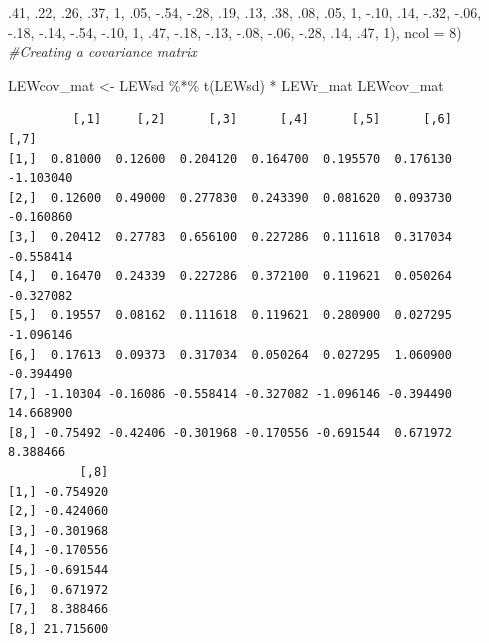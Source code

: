 \documentclass[
  11pt,
]{book}
\newenvironment{Shaded}{\begin{snugshade}}{\end{snugshade}}
\newcommand{\AttributeTok}[1]{\textcolor[rgb]{0.77,0.63,0.00}{#1}}
\newcommand{\CommentTok}[1]{\textcolor[rgb]{0.56,0.35,0.01}{\textit{#1}}}
\newcommand{\DecValTok}[1]{\textcolor[rgb]{0.00,0.00,0.81}{#1}}
\newcommand{\FunctionTok}[1]{\textcolor[rgb]{0.00,0.00,0.00}{#1}}
\newcommand{\NormalTok}[1]{#1}
\newcommand{\OtherTok}[1]{\textcolor[rgb]{0.56,0.35,0.01}{#1}}
\newcommand{\SpecialCharTok}[1]{\textcolor[rgb]{0.00,0.00,0.00}{#1}}
\begin{document}
\begin{Shaded}
\begin{Highlighting}[]
\NormalTok{        .}\DecValTok{41}\NormalTok{, .}\DecValTok{22}\NormalTok{, .}\DecValTok{26}\NormalTok{, .}\DecValTok{37}\NormalTok{, }\DecValTok{1}\NormalTok{, .}\DecValTok{05}\NormalTok{, }\SpecialCharTok{{-}}\NormalTok{.}\DecValTok{54}\NormalTok{, }\SpecialCharTok{{-}}\NormalTok{.}\DecValTok{28}\NormalTok{, }
\NormalTok{        .}\DecValTok{19}\NormalTok{, .}\DecValTok{13}\NormalTok{, .}\DecValTok{38}\NormalTok{, .}\DecValTok{08}\NormalTok{, .}\DecValTok{05}\NormalTok{, }\DecValTok{1}\NormalTok{, }\SpecialCharTok{{-}}\NormalTok{.}\DecValTok{10}\NormalTok{, .}\DecValTok{14}\NormalTok{, }
        \SpecialCharTok{{-}}\NormalTok{.}\DecValTok{32}\NormalTok{, }\SpecialCharTok{{-}}\NormalTok{.}\DecValTok{06}\NormalTok{, }\SpecialCharTok{{-}}\NormalTok{.}\DecValTok{18}\NormalTok{, }\SpecialCharTok{{-}}\NormalTok{.}\DecValTok{14}\NormalTok{, }\SpecialCharTok{{-}}\NormalTok{.}\DecValTok{54}\NormalTok{, }\SpecialCharTok{{-}}\NormalTok{.}\DecValTok{10}\NormalTok{, }\DecValTok{1}\NormalTok{, .}\DecValTok{47}\NormalTok{,}
        \SpecialCharTok{{-}}\NormalTok{.}\DecValTok{18}\NormalTok{, }\SpecialCharTok{{-}}\NormalTok{.}\DecValTok{13}\NormalTok{, }\SpecialCharTok{{-}}\NormalTok{.}\DecValTok{08}\NormalTok{, }\SpecialCharTok{{-}}\NormalTok{.}\DecValTok{06}\NormalTok{, }\SpecialCharTok{{-}}\NormalTok{.}\DecValTok{28}\NormalTok{, .}\DecValTok{14}\NormalTok{, .}\DecValTok{47}\NormalTok{, }\DecValTok{1}\NormalTok{), }\AttributeTok{ncol =} \DecValTok{8}\NormalTok{)}
\CommentTok{\#Creating a covariance matrix}

\NormalTok{LEWcov\_mat }\OtherTok{\textless{}{-}}\NormalTok{ LEWsd }\SpecialCharTok{\%*\%} \FunctionTok{t}\NormalTok{(LEWsd) }\SpecialCharTok{*}\NormalTok{ LEWr\_mat}
\NormalTok{LEWcov\_mat}
\end{Highlighting}
\end{Shaded}

\begin{verbatim}
         [,1]     [,2]      [,3]      [,4]      [,5]      [,6]      [,7]
[1,]  0.81000  0.12600  0.204120  0.164700  0.195570  0.176130 -1.103040
[2,]  0.12600  0.49000  0.277830  0.243390  0.081620  0.093730 -0.160860
[3,]  0.20412  0.27783  0.656100  0.227286  0.111618  0.317034 -0.558414
[4,]  0.16470  0.24339  0.227286  0.372100  0.119621  0.050264 -0.327082
[5,]  0.19557  0.08162  0.111618  0.119621  0.280900  0.027295 -1.096146
[6,]  0.17613  0.09373  0.317034  0.050264  0.027295  1.060900 -0.394490
[7,] -1.10304 -0.16086 -0.558414 -0.327082 -1.096146 -0.394490 14.668900
[8,] -0.75492 -0.42406 -0.301968 -0.170556 -0.691544  0.671972  8.388466
          [,8]
[1,] -0.754920
[2,] -0.424060
[3,] -0.301968
[4,] -0.170556
[5,] -0.691544
[6,]  0.671972
[7,]  8.388466
[8,] 21.715600
\end{verbatim}
\end{document}

